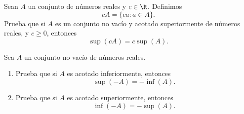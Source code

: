 \documentclass[12pt,a4paper]{book}
\begin{document}
    \begin{ejercicio}\label{ej:45}
        Sean $A$ un conjunto de números reales y $c\in\R$. Definimos
        \begin{equation*}
            cA=\{ca:a\in A\}.
        \end{equation*}
        Prueba que si $A$ es un conjunto no vacío y acotado superiormente de números
        reales, y $c\geq 0$, entonces
        \begin{equation*}
            \sup(cA)=c\sup(A).
        \end{equation*}
    \end{ejercicio}

    \begin{ejercicio}\label{ej:46}
        Sea $A$ un conjunto no vacío de números reales.
        \begin{enumerate}
            \item Prueba que si $A$ es acotado inferiormente, entonces
            \begin{equation*}
                \sup(-A)=-\inf(A).
            \end{equation*}
            \item Prueba que si $A$ es acotado superiormente, entonces
            \begin{equation*}
                \inf(-A)=-\sup(A).
            \end{equation*}
        \end{enumerate}
    \end{ejercicio}
\end{document}
